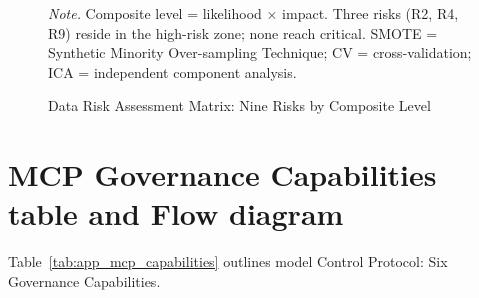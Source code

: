 \begin{figure}[!htbp]
{%
}
\caption{Data Risk Assessment Matrix: Nine Risks by Composite Level}
\label{fig:data_risk_matrix}
\vspace{0.5em}\noindent\textit{Note.} Composite level = likelihood $\times$ impact. Three risks (R2, R4, R9) reside in the high-risk zone; none reach critical. SMOTE = Synthetic Minority Over-sampling Technique; CV = cross-validation; ICA = independent component analysis.
\end{figure}

\iffalse
\clearpage
\section{MCP Governance Capabilities table and Flow diagram}
\label{sec:appendix_ch3_s7}

\noindent Table~\ref{tab:app_mcp_capabilities} outlines model Control Protocol: Six Governance Capabilities.


